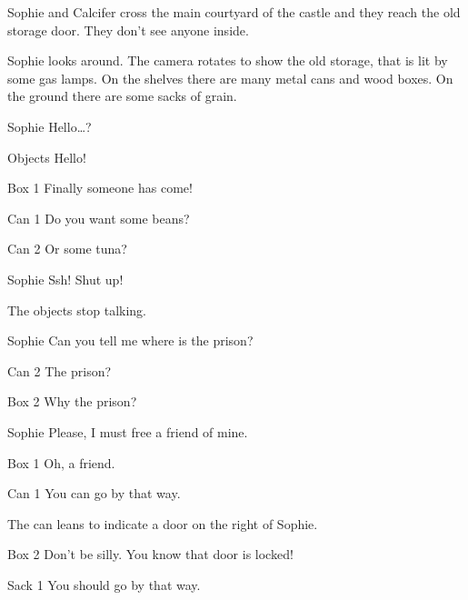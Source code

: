 Sophie and Calcifer cross the main courtyard of the castle and they reach the old storage door. They don't see anyone inside.

\begin{screenplay}

Sophie looks around. The camera rotates to show the old storage, that is lit by some gas lamps. On the shelves there are many metal cans and wood boxes. On the ground there are some sacks of grain.

\begin{dialogue}{Sophie}
Hello…?
\end{dialogue}
\begin{dialogue}[cheerful]{Objects}
 Hello!
\end{dialogue}
\begin{dialogue}{Box 1}
 Finally someone has come!
\end{dialogue}
\begin{dialogue}{Can 1}
 Do you want some beans?
\end{dialogue}
\begin{dialogue}{Can 2}
Or some tuna?
\end{dialogue}
\begin{dialogue}[worried]{Sophie}
Ssh! Shut up!
\end{dialogue}
The objects stop talking.
\begin{dialogue}{Sophie}
Can you tell me where is the prison?
\end{dialogue}
\begin{dialogue}[surprised]{Can 2}
The prison?
\end{dialogue}
\begin{dialogue}[surprised]{Box 2}
Why the prison?
\end{dialogue}
\begin{dialogue}{Sophie}
Please, I must free a friend of mine.
\end{dialogue}
\begin{dialogue}{Box 1}
Oh, a friend.
\end{dialogue}
\begin{dialogue}{Can 1}
You can go by that way.
\end{dialogue}
The can leans to indicate a door on the right of Sophie.
\begin{dialogue}{Box 2}
Don't be silly. You know that door is locked!
\end{dialogue}
\begin{dialogue}{Sack 1}
You should go by that way.

\end{dialogue}
\end{screenplay}
